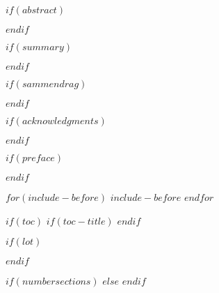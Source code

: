 \documentclass[11pt,twoside,openright,titlepage,
  headinclude,footinclude,BCOR=5mm,
  numbers=noenddot,cleardoublepage=empty,
  tablecaptionabove, dottedtoc,
  bibliography=totoc,paper=a4]{scrreprt}
\begin{document}
$if(abstract)$
\cleardoublepage

$endif$

\begingroup
$if(summary)$

$endif$

$if(sammendrag)$
\begin{otherlanguage}{norsk}

\end{otherlanguage}
$endif$
\endgroup

$if(acknowledgments)$
\begingroup
\cleardoublepage
{}

\endgroup
$endif$

$if(preface)$
\begingroup
\cleardoublepage
{}

\endgroup
$endif$

$for(include-before)$
$include-before$
$endfor$

$if(toc)$
\cleardoublepage
{}
{}
\setcounter{tocdepth}{$if(tocdepth)$$tocdepth$$else$1$endif$}
\begingroup 
  \let\clearpage\relax
  \let\cleardoublepage\relax
  $if(toc-title)$
  \renewcommand*\contentsname{$toc-title$}
  $endif$
  \tableofcontents
\endgroup
\markboth{\spacedlowsmallcaps{\contentsname}}
{\spacedlowsmallcaps{\contentsname}} 

\begingroup
$if(lot)$
\cleardoublepage
\listoftables
\vfill
\let\clearpage\relax
\let\cleardoublepage\relax
$endif$

$if(numbersections)$
\setcounter{secnumdepth}{$if(secnumdepth)$$secnumdepth$$else$5$endif$}
$else$
\setcounter{secnumdepth}{-\maxdimen} %
$endif$
\end{document}
